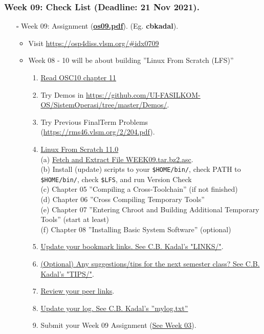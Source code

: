 \begin{frame}
\frametitle{Week 09: Check List (Deadline: 21 Nov 2021).}
\begin{itemize}
\item [$\square$] Week 09: Assignment (\href{https://os.vlsm.org/Slides/os09.pdf}{\textbf{os09.pdf}}).
(Eg. \textbf{cbkadal}).
\begin{itemize}
\item Visit \url{https://osp4diss.vlsm.org/\#idx0709}
\item Week 08 - 10 will be about building ''Linux From Scratch (LFS)''
\begin{enumerate}
\item \href{https://www.os-book.com/OS10/slide-dir/}{Read OSC10 chapter 11}
\item Try Demos in {\tiny \url{https://github.com/UI-FASILKOM-OS/SistemOperasi/tree/master/Demos/}}.
\item Try Previous FinalTerm Problems {\tiny (\url{https://rms46.vlsm.org/2/204.pdf})}.
\item \href{https://osp4diss.vlsm.org/W09.html}{Linux From Scratch 11.0} \\
(a) \href{https://os.vlsm.org/WEEK/WEEK09.tar.bz2.asc}{Fetch and Extract File WEEK09.tar.bz2.asc}.\\
(b) Install (update) scripts to your \texttt{\$HOME/bin/},
    check PATH to \texttt{\$HOME/bin/},
    check \texttt{\$LFS}, and
    run Version Check\\
(c) Chapter 05 ''Compiling a Cross-Toolchain'' (if not finished)\\
(d) Chapter 06 ''Cross Compiling Temporary Tools''\\
(e) {\tiny Chapter 07 ''Entering Chroot and Building Additional Temporary Tools'' (start at least)}\\
(f) Chapter 08 ''Installing Basic System Software'' (optional)\\
\item \href{https://cbkadal.github.io/os212/LINKS/}{Update your bookmark links. See C.B. Kadal's "LINKS/"}.
\item \href{https://cbkadal.github.io/os212/TIPS/}{(Optional) Any suggestions/tips for the next semester class? See C.B. Kadal's "TIPS/"}.
\item \href{https://osp4diss.vlsm.org/W02-05.html}{Review your peer links}.
\item \href{https://cbkadal.github.io/os212/TXT/mylog.txt}{Update your log. See C.B. Kadal's ''mylog.txt''}
\item Submit your Week 09 Assignment (\href{https://osp4diss.vlsm.org/W03-06.html}{See Week 03}).
\end{enumerate}
\end{itemize}
\end{itemize}
\end{frame}
